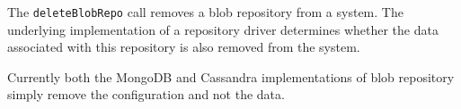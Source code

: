 The \verb+deleteBlobRepo+ call removes a blob repository from a \Rapture system. The underlying
implementation of a repository driver determines whether the data associated with this repository
is also removed from the system.

Currently both the MongoDB and Cassandra implementations of blob repository simply remove the configuration
and not the data.
